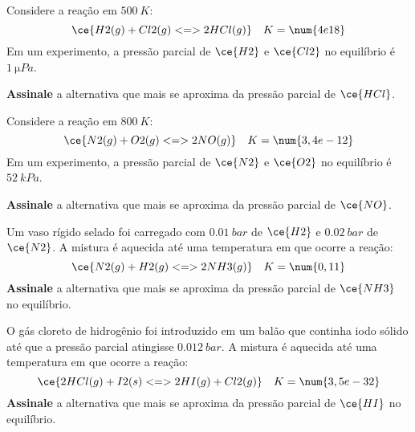 \begin{problem}[
	id={2F21},
	path={/home/braun/Documents/Developer/braunchem/data/problems/Q2/2F/2F21}
]
Considere a reação em {\(\qty{500}{\unit{K}}\)}: {\[
    \ce{ H2(g) + Cl2(g) <=> 2 HCl(g) } \quad K = \num{4e18}
\]} Em um experimento, a pressão parcial de {\(\ce{H2}\)} e {\(\ce{Cl2}\)} no equilíbrio é {\(\qty{1}{\unit{\micro Pa}}\)}.

\textbf{Assinale} a alternativa que mais se aproxima da pressão parcial de {\(\ce{HCl}\)}.
\end{problem}


\begin{problem}[
	id={2F22},
	path={/home/braun/Documents/Developer/braunchem/data/problems/Q2/2F/2F22}
]
Considere a reação em {\(\qty{800}{\unit{K}}\)}: {\[
    \ce{ N2(g) + O2(g) <=> 2 NO(g) } \quad K = \num{3,4e-12}
\]} Em um experimento, a pressão parcial de {\(\ce{N2}\)} e {\(\ce{O2}\)} no equilíbrio é {\(\qty{52}{\unit{kPa}}\)}.

\textbf{Assinale} a alternativa que mais se aproxima da pressão parcial de {\(\ce{NO}\)}.
\end{problem}


\begin{problem}[
	id={2F23},
	path={/home/braun/Documents/Developer/braunchem/data/problems/Q2/2F/2F23}
]
Um vaso rígido selado foi carregado com {\(\qty{0,01}{\unit{bar}}\)} de {\(\ce{H2}\)} e {\(\qty{0,02}{\unit{bar}}\)} de {\(\ce{N2}\)}. A mistura é
aquecida até uma temperatura em que ocorre a reação: {\[
    \ce{ N2(g) + H2(g) <=> 2 NH3(g) } \quad K = \num{0,11}
\]} \textbf{Assinale} a alternativa que mais se aproxima da pressão parcial de {\(\ce{NH3}\)} no equilíbrio.
\end{problem}


\begin{problem}[
	id={2F24},
	path={/home/braun/Documents/Developer/braunchem/data/problems/Q2/2F/2F24}
]
O gás cloreto de hidrogênio foi introduzido em um balão que continha iodo sólido até que a pressão parcial atingisse {\(\qty{0,012}{\unit{bar}}\)}. A
mistura é aquecida até uma temperatura em que ocorre a reação: {\[
    \ce{ 2 HCl(g) + I2(s) <=> 2 HI(g) + Cl2(g) } \quad K =
\num{3,5e-32}
\]} \textbf{Assinale} a alternativa que mais se aproxima da pressão parcial de {\(\ce{HI}\)} no equilíbrio.
\end{problem}


